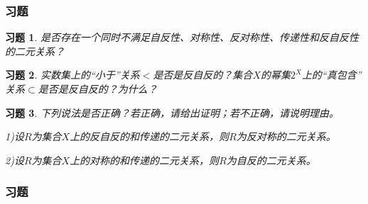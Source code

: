 \documentclass{beamer}
\newtheorem*{Exercise}{习题}
\begin{document}
\begin{CJK*}{UTF8}{gbsn}


  

  

\begin{frame}  
  \frametitle{习题}
  \begin{Exercise}
  是否存在一个同时不满足自反性、对称性、反对称性、传递性和反自反性的二元关系？    
  \end{Exercise}
  \begin{Exercise}
  实数集上的“小于”关系$<$是否是反自反的？集合$X$的幂集$2^X$上的“真包含”
  关系$\subset$是否是反自反的？为什么？    
  \end{Exercise}

  \begin{Exercise}
  下列说法是否正确？若正确，请给出证明；若不正确，请说明理由。
  
  1)设$R$为集合$X$上的反自反的和传递的二元关系，则$R$为反对称的二元关系。
  
  2)设$R$为集合$X$上的对称的和传递的二元关系，则$R$为自反的二元关系。    
  \end{Exercise}
\end{frame}
\begin{frame}  
  \frametitle{习题}


\end{frame}
\end{CJK*}
\end{document}
